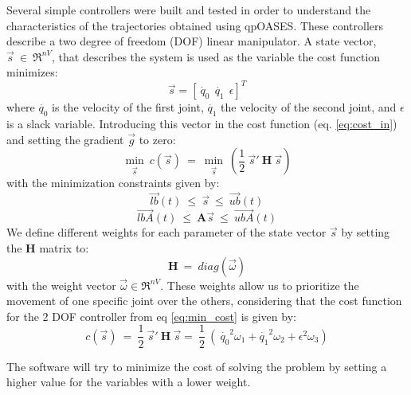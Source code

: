 Several simple controllers were built and tested in order to understand the characteristics of the trajectories obtained using qpOASES. These controllers describe a two degree of freedom (DOF) linear manipulator. A state vector, $\vec{s}\ \in\ \Re^{nV}$, that describes the system is used as the variable the cost function minimizes:
\begin{equation}
 \vec{s} = [\dot{\ q_{0}} \ \ \dot{q_{1}} \ \ \epsilon ]^{T}
 \label{eq:state}
\end{equation}
where $\dot{q_{0}}$ is the velocity of the first joint, $\dot{q_{1}}$ the velocity of the second joint, and $\epsilon$ is a slack variable. Introducing this vector in the cost function (eq. \ref{eq:cost_in}) and setting the gradient $\vec{g}$ to zero:
\begin{equation}
\underset{\vec{s}}{\min}\ c(\vec{s})\ =\  \underset{\vec{s}}{\min}\ \left( \frac{1}{2} \ \vec{s}' \ \textbf{H} \ \vec{s} \right)
\label{eq:min_cost}
\end{equation}
with the minimization constraints given by:
\begin{equation}
\vec{lb}(t)\ \leq\ \vec{s}\ \leq\ \vec{ub}(t)
\label{eq:constrain}
\end{equation}
\begin{equation}
\vec{lbA}(t)\ \leq\ \textbf{A} \vec{s}\ \leq\ \vec{ubA}(t)
\label{eq:constrainA}
\end{equation}
We define different weights for each parameter of the state vector $\vec{s}$ by setting the $\textbf{H}$ matrix to:
$$
\textbf{H}\ =\ diag(\vec{\omega})
$$
with the weight vector $\vec{\omega} \in \Re^{nV}$. These weights allow us to prioritize the movement of one specific joint over the others, considering that the cost function for the 2 DOF controller from eq \ref{eq:min_cost} is given by:
\begin{equation}
c(\vec{s})\ =\ \frac{1}{2} \ \vec{s}' \ \textbf{H} \ \vec{s} =\ \frac{1}{2} \ (\ \dot{q_{0}}^{2}\omega_{1} + \dot{q_{1}}^{2}\omega_{2} + \epsilon^{2}\omega_{3})
\label{eq:cost}
\end{equation}

The software will try to minimize the cost of solving the problem by setting a higher value for the variables with a lower weight.

